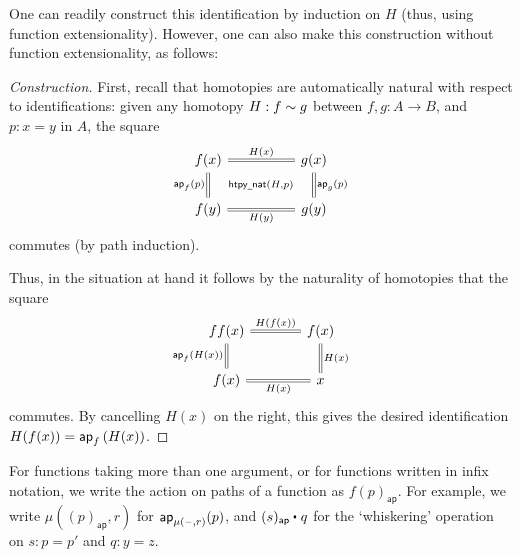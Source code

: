 One can readily construct this identification by induction on $H$ (thus, using function extensionality). However, one can also make this construction without function extensionality, as follows:

\begin{proof}[Construction]
First, recall that homotopies are automatically natural with respect to identifications: given any homotopy $H:f\sim g$ between $f,g:A\to B$, and $p:x=y$ in $A$, the square
\begin{equation*}
\begin{tikzcd}[column sep=huge]
f(x) \arrow[r,equals,"H(x)"] \arrow[d,equals,swap,"\mathsf{ap}_{f}(p)",""{name=A,right}] & g(x) \arrow[d,equals,"\ap{g}{p}",""{name=B,left}] \arrow[draw=none,from=A,to=B,"{\mathsf{htpy\underline{~}nat}(H,p)}" description] \\
f(y) \arrow[r,equals,swap,"H(y)"] & g(y)
\end{tikzcd}
\end{equation*}
commutes (by path induction). 

Thus, in the situation at hand it follows by the naturality of homotopies that the square
\begin{equation*}
\begin{tikzcd}[column sep=large]
ff(x) \arrow[d,swap,equals,"\mathsf{ap}_{f}(H(x))"] \arrow[r,equals,"H(f(x))"] & f(x) \arrow[d,equals,"H(x)"] \\
f(x) \arrow[r,swap,equals,"H(x)"] & x
\end{tikzcd}
\end{equation*}
commutes. By cancelling $H(x)$ on the right, this gives the desired identification $H(f(x))=\mathsf{ap}_{f}\left({H(x)}\right)$.
\end{proof}

\begin{rmk}
For functions taking more than one argument, or for functions written in infix notation, we write the action on paths of a function as $f(p)_{\mathsf{ap}}$. For example, we write $\mu((p)_{\mathsf{ap}},r)$ for $\mathsf{ap}_{\mu(\mathord{\hspace{1pt}\text{--}\hspace{1pt}},r)}(p)$, and $\ct{(s)_{\mathsf{ap}}}{q}$ for the `whiskering' operation on $s:p=p'$ and $q:y=z$. 
\end{rmk}

